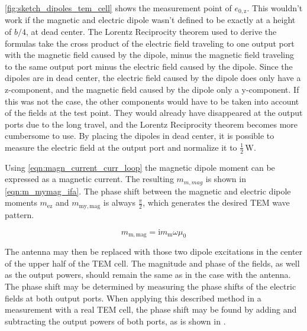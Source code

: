 \autoref{fig:sketch_dipoles_tem_cell} shows the measurement point of $e_\mathrm{0,z}$. This wouldn't work if the magnetic and electric dipole wasn't defined to be exactly at a height of $b/4$, at dead center. The Lorentz Reciprocity theorem used to derive the formulas take the cross product of the electric field traveling to one output port with the magnetic field caused by the dipole, minus the magnetic field traveling to the same output port minus the electric field caused by the dipole. Since the dipoles are in dead center, the electric field caused by the dipole does only have a z-component, and the magnetic field caused by the dipole only a y-component. If this was not the case, the other components would have to be taken into account of the fields at the test point. They would already have disappeared at the output ports due to the long travel, and the Lorentz Reciprocity theorem becomes more cumbersome to use. By placing the dipoles in dead center, it is possible to measure the electric field at the output port and normalize it to $\frac{1}{2}\,\mathrm{W}$.


Using \autoref{eqn:magn_current_curr_loop} the magnetic dipole moment can be expressed as a magnetic current. The resulting $m_{m,mag}$ is shown in \autoref{eqn:m_mymag_ifa}. The phase shift between the magnetic and electric dipole moments $m_{\mathrm{ez}}$ and $m_{\mathrm{my,mag}}$ is always $\frac{\pi}{2}$, which generates the desired TEM wave pattern.

\begin{equation}
    m_{\mathrm{m,mag}}=\mathrm{i}m_{\mathrm{m}}\omega\mu_0
    \label{eqn:m_mymag_ifa}
\end{equation}

The antenna may then be replaced with those two dipole excitations in the center of the upper half of the TEM cell. The magnitude and phase of the fields, as well as the output powers, should remain the same as in the case with the antenna. The phase shift may be determined by measuring the phase shifts of the electric fields at both output ports. When applying this described method in a measurement with a real TEM cell, the phase shift may be found by adding and subtracting the output powers of both ports, as is shown in \cite{Sreenivasiah_Chang_Ma_1981}.

